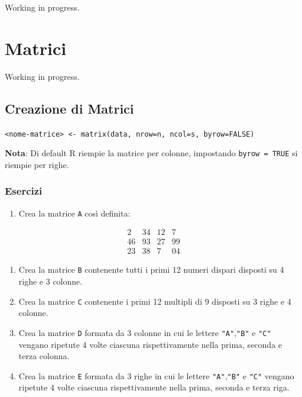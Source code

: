 \documentclass[
]{book}
\providecommand{\tightlist}{%
  \setlength{\itemsep}{0pt}\setlength{\parskip}{0pt}}
\begin{document}
Working in progress.

\hypertarget{matrix}{%
\chapter{Matrici}\label{matrix}}

Working in progress.

\hypertarget{creazione-di-matrici}{%
\section{Creazione di Matrici}\label{creazione-di-matrici}}

\texttt{\textless{}nome-matrice\textgreater{}\ \textless{}-\ matrix(data,\ nrow=n,\ ncol=s,\ byrow=FALSE)}

\textbf{Nota}: Di default R riempie la matrice per colonne, impostando \texttt{byrow\ =\ TRUE} si riempie per righe.

\hypertarget{esercizi-5}{%
\subsection*{Esercizi}\label{esercizi-5}}

\begin{enumerate}
\def\labelenumi{\arabic{enumi}.}
\tightlist
\item
  Crea la matrice \texttt{A} così definita:
\end{enumerate}

\[\begin{matrix}
2 & 34 & 12 & 7\\
46 & 93 & 27 & 99\\
23  & 38 & 7 & 04
\end{matrix}
\]

\begin{enumerate}
\def\labelenumi{\arabic{enumi}.}
\setcounter{enumi}{1}
\tightlist
\item
  Crea la matrice \texttt{B} contenente tutti i primi 12 numeri dispari disposti su 4 righe e 3 colonne.
\item
  Crea la matrice \texttt{C} contenente i primi 12 multipli di 9 disposti su 3 righe e 4 colonne.
\item
  Crea la matrice \texttt{D} formata da 3 colonne in cui le lettere \texttt{"A"},\texttt{"B"} e \texttt{"C"} vengano ripetute 4 volte ciascuna rispettivamente nella prima, seconda e terza colonna.
\item
  Crea la matrice \texttt{E} formata da 3 righe in cui le lettere \texttt{"A"},\texttt{"B"} e \texttt{"C"} vengano ripetute 4 volte ciascuna rispettivamente nella prima, seconda e terza riga.
\end{enumerate}
\end{document}

